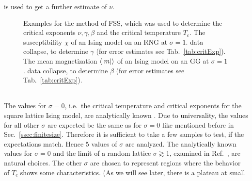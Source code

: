     is used to get a further estimate of \(\nu\).
    \begin{figure}[htbp]
        \centering
        \caption[Examples of Determining Critical Temperature and Exponents]
        {
            Examples for the method of FSS, which was used
            to determine the critical exponents \(\nu, \gamma, \beta\) and
            the critical temperature \(T_c\).
             The susceptibility \(\chi\)
                of an Ising model on an RNG at \(\sigma=1\).
             data collapse, to determine \(\gamma\) (for error estimates see Tab.\ \ref{tab:critExp}).
             The mean magnetization \(\left< \left\vert m\right\vert \right>\)
                of an Ising model on an GG at \(\sigma=1\).
             data collapse, to determine \(\beta\) (for error estimates see Tab.\ \ref{tab:critExp}).
        }
        \label{fig:gettingCrit2}
    \end{figure}\\
    The values for \(\sigma = 0\), i.e.\ the critical temperature and
    critical exponents for the square lattice Ising model,
    are analytically known \cite{Pelissetto2002}. Due to universality, the
    values for all other \(\sigma\) are expected be the same as for
    \(\sigma = 0\) like mentioned before in Sec.\ \ref{ssec:finitesize}.
    Therefore it is sufficient to take a few samples to test, if the
    expectations match. Hence 5 values of \(\sigma\) are analyzed.
    The analytically known values for \(\sigma = 0\) and the
    limit of a random lattice \(\sigma \gtrsim 1\), examined in
    Ref.\ \cite{Janke1994}, are natural choices.
    The other \(\sigma\) are chosen to represent regions where the behavior of
    \(T_c\) shows some characteristics. (As we will see later, there is a plateau at small
